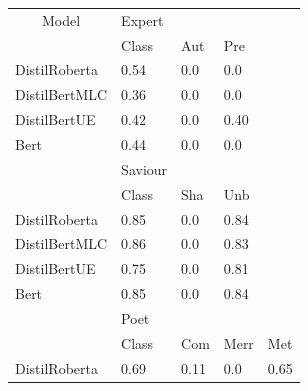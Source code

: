 \documentclass[11pt]{article}
\begin{document}
\begin{table}[h]
	\begin{tabular}{|l|llll}
		\cline{1-4}
		\multicolumn{1}{|c|}{Model} & \multicolumn{3}{l|}{Expert} &                                                              \\ \cline{1-4}
		                            & Class                       & Aut  & \multicolumn{1}{l|}{Pre}  &                           \\ \cline{1-4}
		DistilRoberta               & 0.54                        & 0.0  & \multicolumn{1}{l|}{0.0}  &                           \\
		DistilBertMLC               & 0.36                        & 0.0  & \multicolumn{1}{l|}{0.0}  &                           \\
		DistilBertUE                & 0.42                        & 0.0  & \multicolumn{1}{l|}{0.40} &                           \\
		Bert                        & 0.44                        & 0.0  & \multicolumn{1}{l|}{0.0}  &                           \\ \cline{1-4}
		                            & Saviour                     &      & \multicolumn{1}{l|}{}     &                           \\
		                            & Class                       & Sha  & \multicolumn{1}{l|}{Unb}  &                           \\ \cline{1-4}
		DistilRoberta               & 0.85                        & 0.0  & \multicolumn{1}{l|}{0.84} &                           \\
		DistilBertMLC               & 0.86                        & 0.0  & \multicolumn{1}{l|}{0.83} &                           \\
		DistilBertUE                & 0.75                        & 0.0  & \multicolumn{1}{l|}{0.81} &                           \\
		Bert                        & 0.85                        & 0.0  & \multicolumn{1}{l|}{0.84} &                           \\ \hline
		                            & Poet                        &      &                           & \multicolumn{1}{l|}{}     \\
		                            & Class                       & Com  & Merr                      & \multicolumn{1}{l|}{Met}  \\ \hline
		DistilRoberta               & 0.69                        & 0.11 & 0.0                       & \multicolumn{1}{l|}{0.65} \\

\end{tabular}
\end{table}
\end{document}
